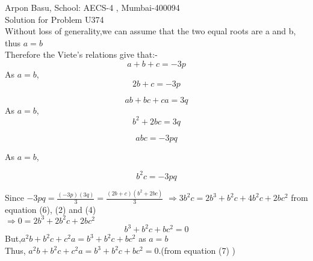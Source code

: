 \documentclass[10pt,a4paper]{extarticle}
\begin{document}
 
Arpon Basu, School: AECS-4 , Mumbai-400094\\
 
Solution for Problem U374 \\

Without loss of generality,we can assume that the two equal roots are a and b, thus $a=b$\\
Therefore the Viete's relations give that:-\\

\begin{equation}
a+b+c=-3p 
\end{equation}
As $a=b$, 
\begin{equation}
 2b+c=-3p
\end{equation}

\begin{equation}
ab+bc+ca=3q
\end{equation}
As $a=b$, 
\begin{equation}
b^{2}+2bc=3q
\end{equation}

\begin{equation}
abc=-3pq
\end{equation}

As $a=b$, 

\begin{equation}
b^{2}c=-3pq
\end{equation}

Since $-3pq=\frac{(-3p)(3q)}{3}=\frac{(2b+c)(b^{2}+2bc)}{3}$ 
$\Rightarrow 3b^{2}c=2b^{3}+b^{2}c+4b^{2}c+2bc^{2}$ from equation (6), (2) and (4)\\
$\Rightarrow 0=2b^{3}+2b^{2}c+2bc^{2}$\\
\begin{equation}
b^{3}+b^{2}c+bc^{2}=0 
\end{equation}
But,$a^{2}b+b^{2}c+c^{2}a=b^{3}+b^{2}c+bc^{2}$ as $a=b$\\

Thus, $a^{2}b+b^{2}c+c^{2}a=b^{3}+b^{2}c+bc^{2}=0$.(from equation (7) )\\
 
\end{document}
